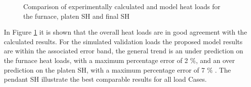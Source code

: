 \documentclass[review]{elsarticle}
\begin{document}
\begin{figure}[h!]
\caption{Comparison of experimentally calculated and model heat loads for the furnace, platen SH and final SH}
\label{fig_heat_valid}
\end{figure}
\clearpage
In Figure \ref{fig_heat_valid} it is shown that the overall heat loads are in good agreement with the calculated results. For the simulated validation loads the proposed model results are within the associated error band, the general trend is an under prediction on the furnace heat loads, with a maximum percentage error of 2 \%, and an over prediction on the platen SH, with a maximum percentage error of 7 \% . The pendant SH illustrate the best comparable results for all load Cases.
\end{document}
